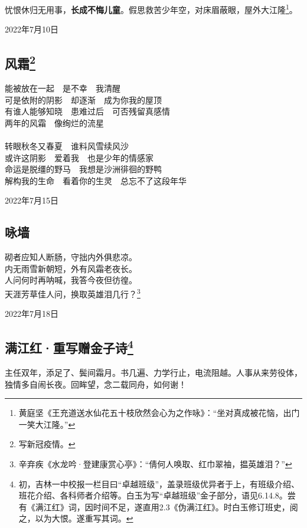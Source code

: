 \documentclass[a5paper]{ctexart}
\begin{document}
	忧恨休归无用事，\textbf{长成不悔儿童}。假思救苦少年空，对床眉蔽眼，屋外大江隆\footnote{黄庭坚《王充道送水仙花五十枝欣然会心为之作咏》：“坐对真成被花恼，出门一笑大江隆。”}。
	\begin{flushright}
		2022年7月10日
	\end{flushright}
	
	\subsection[风霜]{风霜\footnote{写新冠疫情。}}
	\begin{center}
		能被放在一起\ \ 是不幸\ \ 我清醒\\
		可是依附的阴影\ \ 却逐渐\ \ 成为你我的屋顶\\
		有谁人能够知晓\ \ 患难过后\ \  可否残留真感情\\
		两年的风霜\ \ 像绚烂的流星\\ \hspace*{\fill} \\
		
		转眼秋冬又春夏\ \ 谁料风雪续风沙\\
		或许这阴影\ \  爱着我\ \  也是少年的情感家\\
		命运是脱缰的野马\ \  我想是沙洲徘徊的野鸭\\
		解构我的生命\ \ 看着你的生灵\ \ 总忘不了这段年华
	\end{center}
	\hfill 2022年7月15日
	
	\subsection{咏墙}
	\begin{center}
		砌者应知人断肠，守拙内外俱悲凉。\\
		内无雨雪新朝短，外有风霜老夜长。\\
		人问何时再呐喊，我答今夜但彷徨。\\
		天涯芳草佳人问，换取英雄泪几行？\footnote{辛弃疾《水龙吟·登建康赏心亭》：“倩何人唤取、红巾翠袖，揾英雄泪？”}
		
	\end{center}
	\hfill 2022年7月18日
	
	\subsection[满江红·重写赠金子诗]{满江红·重写赠金子诗\footnote{初，吉林一中校报一栏目曰“卓越班级”，盖录班级优异者于上，有班级介绍、班花介绍、各科师者介绍等。白玉为写“卓越班级”金子部分，语见6.14.8。尝有《满江红》词，因时间不足，遂直用2.3《伪满江红》。时白玉修订班史，阅之，以为大恨。遂重写其词。}}
	主任双年，添足了、鬓间霜月。书几遍、力学行止，电流阻越。人事从来劳役体，独情多自闹长夜。回眸望，念二载同舟，如何谢！
	
\end{document}
